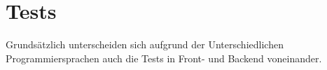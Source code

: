 \section{Tests}
Grundsätzlich unterscheiden sich aufgrund der Unterschiedlichen Programmiersprachen auch die Tests in Front- und Backend voneinander.

